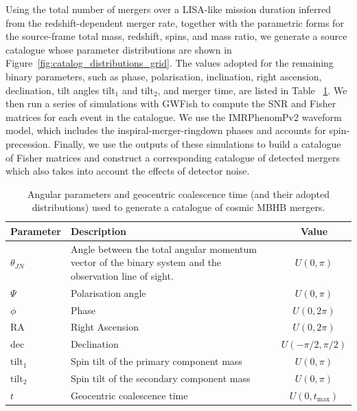 \documentclass[a4paper,12pt]{article}
\begin{document}
Using the total number of mergers over a LISA-like mission duration inferred from the redshift-dependent merger rate, together with the parametric forms for the source-frame total mass, redshift, spins, and mass ratio, we generate a source catalogue whose parameter distributions are shown in Figure~\ref{fig:catalog_distributions_grid}. The values adopted for the remaining binary parameters, such as phase, polarisation, inclination, right ascension, declination, tilt angles $\mathrm{tilt}_1$ and $\mathrm{tilt}_2$, and merger time, are listed in Table ~\ref{tab:values_remparameters}. We then run a series of simulations with GWFish to compute the SNR and Fisher matrices for each event in the catalogue. We use the IMRPhenomPv2 waveform model, which includes the inspiral-merger-ringdown phases and accounts for spin-precession. Finally, we use the outputs of these simulations to build a catalogue of Fisher matrices and construct a corresponding catalogue of detected mergers which also takes into account the effects of detector noise.

\begin{table}[!htbp]
\captionsetup{font=footnotesize}
\centering
\caption{Angular parameters and geocentric coalescence time (and their adopted distributions) used to generate a catalogue of cosmic MBHB mergers.}
\footnotesize
\setlength{\tabcolsep}{4pt}
\renewcommand\arraystretch{1.12}
\begin{tabular}{@{} l p{10.6cm} c @{}}
\toprule
Parameter & Description & Value \\
\midrule
$\theta_{JN}$ & Angle between the total angular momentum vector of the binary system and the observation line of sight. & $U(0,\pi)$ \\
$\Psi$ & Polarisation angle & $U(0,\pi)$ \\
$\phi$ & Phase & $U(0,2\pi)$ \\
$\mathrm{RA}$ & Right Ascension & $U(0,2\pi)$ \\
$\mathrm{dec}$ & Declination & $U(-\pi/2,\pi/2)$ \\
$\mathrm{tilt}_{1}$ & Spin tilt of the primary component mass & $U(0,\pi)$ \\
$\mathrm{tilt}_{2}$ & Spin tilt of the secondary component mass & $U(0,\pi)$ \\
$t$ & Geocentric coalescence time & $U(0,t_{\mathrm{max}})$ \\
\bottomrule
\end{tabular}
\label{tab:values_remparameters}
\end{table}
\end{document}
